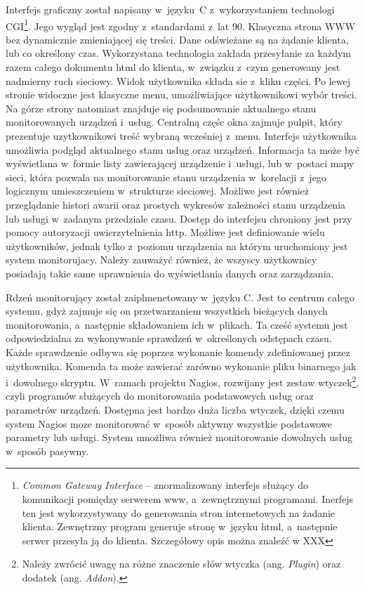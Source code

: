 Interfejs graficzny został napisany w~języku~C z~wykorzystaniem
technologi CGI\footnote{{\em Common Gateway Interface} --
  znormalizowany interfejs służący do komunikacji pomiędzy serwerem
  www, a~zewnętrznymi programami. Inerfejs ten jest wykorzystywany do
  generowania stron internetowych na żadanie klienta. Zewnętrzny
  program generuje stronę w~języku html, a~następnie serwer przesyła
  ją do klienta. Szczegółowy opis można znaleźć w XXX}. Jego wygląd
jest zgodny z~standardami z~lat 90. Klasyczna strona WWW bez
dynamicznie zmieniającej się treści. Dane odświeżane są na żądanie
klienta, lub co określony czas. Wykorzystana technologia zakłada
przesyłanie za każdym razem całego dokumentu html do klienta,
w~związku z~czym generowany jest nadmierny ruch sieciowy. Widok
użytkownika składa sie z~kliku części. Po lewej stronie widoczne jest
klasyczne menu, umożliwiające użytkownikowi wybór treści. Na górze
strony natomiast znajduje się podsumowanie aktualnego stanu
monitorowanych urządzeń i~usług. Centralną częśc okna zajmuje pulpit,
który prezentuje uzytkownikowi treść wybraną wcześniej
z~menu. Interfejs użytkownika umożliwia podgląd aktualnego stanu usług
oraz urządzeń. Informacja ta może być wyświetlana w~formie listy
zawierającej urządzenie i~usługi, lub w~postaci mapy sieci, która
pozwala na monitorowanie stanu urządzenia w~korelacji z~jego logicznym
umieszczeniem w~strukturze sieciowej. Możliwe jest również
przeglądanie histori awarii oraz prostych wykresów zależności stanu
urządzenia lub usługi w~zadanym przedziale czasu. Dostęp do interfejsu
chroniony jest przy pomocy autoryzacji uwierzytelnienia http. Możliwe
jest definiowanie wielu użytkowników, jednak tylko z~poziomu
urządzenia na którym uruchomiony jest system monitorujacy. Należy
zauważyć również, że wszyscy użytkownicy posiadają takie same
uprawnienia do wyświetlania danych oraz zarządzania.

Rdzeń monitorujący został zaiplmenetowany w~języku C. Jest to centrum
całego systemu, gdyż zajmuje się on przetwarzaniem wszystkich
bieżących danych monitorowania, a~następnie składowaniem ich
w~plikach. Ta cześć systemu jest odpowiedzialna za wykonywanie
sprawdzeń w~określonych odstępach czasu. Każde sprawdzenie odbywa się
poprzez wykonanie komendy zdefiniowanej przez użytkownika. Komenda ta
może zawierać zarówno wykonanie pliku binarnego jak i~dowolnego
skryptu. W~ramach projektu Nagios, rozwijany jest zestaw
wtyczek\footnote{Należy zwrócić uwagę na różne znaczenie słów wtyczka
  (ang. {\em Plugin}) oraz dodatek (ang. {\em Addon}). }, czyli
programów służących do monitorowania podstawowych usług oraz
parametrów urządzeń. Dostępna jest bardzo duża liczba wtyczek, dzięki
czemu system Nagios moze monitorować w~sposób aktywny wszystkie
podstawowe parametry lub usługi. System umożliwa również monitorowanie
dowolnych usług w~sposób pasywny.

